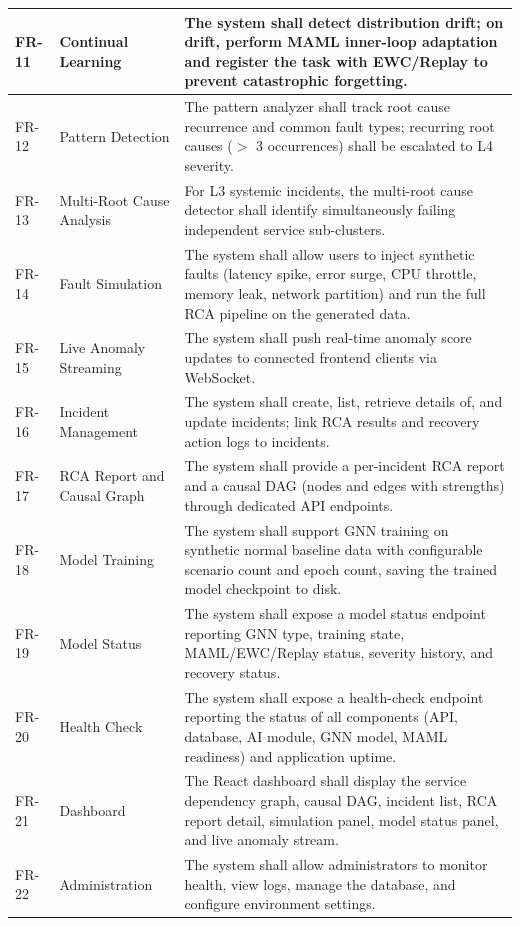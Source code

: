 \documentclass[11pt,a4paper]{article}
\begin{document}
\begin{longtable}{|C{1.6cm}|L{4.0cm}|L{9.6cm}|}
FR-11 & Continual Learning & The system shall detect distribution drift; on drift, perform MAML inner-loop adaptation and register the task with EWC/Replay to prevent catastrophic forgetting. \\ \hline
FR-12 & Pattern Detection & The pattern analyzer shall track root cause recurrence and common fault types; recurring root causes ($>$ 3 occurrences) shall be escalated to L4 severity. \\ \hline
FR-13 & Multi-Root Cause Analysis & For L3 systemic incidents, the multi-root cause detector shall identify simultaneously failing independent service sub-clusters. \\ \hline
FR-14 & Fault Simulation & The system shall allow users to inject synthetic faults (latency spike, error surge, CPU throttle, memory leak, network partition) and run the full RCA pipeline on the generated data. \\ \hline
FR-15 & Live Anomaly Streaming & The system shall push real-time anomaly score updates to connected frontend clients via WebSocket. \\ \hline
FR-16 & Incident Management & The system shall create, list, retrieve details of, and update incidents; link RCA results and recovery action logs to incidents. \\ \hline
FR-17 & RCA Report and Causal Graph & The system shall provide a per-incident RCA report and a causal DAG (nodes and edges with strengths) through dedicated API endpoints. \\ \hline
FR-18 & Model Training & The system shall support GNN training on synthetic normal baseline data with configurable scenario count and epoch count, saving the trained model checkpoint to disk. \\ \hline
FR-19 & Model Status & The system shall expose a model status endpoint reporting GNN type, training state, MAML/EWC/Replay status, severity history, and recovery status. \\ \hline
FR-20 & Health Check & The system shall expose a health-check endpoint reporting the status of all components (API, database, AI module, GNN model, MAML readiness) and application uptime. \\ \hline
FR-21 & Dashboard & The React dashboard shall display the service dependency graph, causal DAG, incident list, RCA report detail, simulation panel, model status panel, and live anomaly stream. \\ \hline
FR-22 & Administration & The system shall allow administrators to monitor health, view logs, manage the database, and configure environment settings. \\ \hline

\end{longtable}
\end{document}
